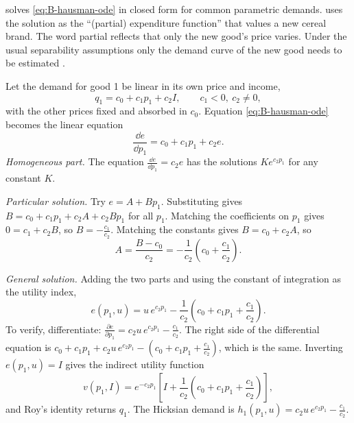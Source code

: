 \citet{Hausman1981} solves \eqref{eq:B-hausman-ode} in closed form for common parametric demands.
\citet[eq.~3, p.~212]{Hausman1997} uses the solution as the ``(partial) expenditure function'' that values a
new cereal brand. The word partial reflects that only the new good's price varies. Under the usual
separability assumptions only the demand curve of the new good needs to be estimated \citep[fn.~7]{Hausman1997}.

\begin{example}\label{ex:B-hausman-linear}
Let the demand for good 1 be linear in its own price and income,
\begin{equation*}
q_1 = c_0 + c_1p_1 + c_2I, \qquad c_1 < 0,\ c_2 \neq 0,
\end{equation*}
with the other prices fixed and absorbed in $c_0$. Equation \eqref{eq:B-hausman-ode} becomes the linear
equation
\begin{equation*}
\frac{\dd e}{\dd p_1} = c_0 + c_1p_1 + c_2e .
\end{equation*}
\textit{Homogeneous part.} The equation $\frac{\dd e}{\dd p_1} = c_2e$ has the solutions $Ke^{c_2p_1}$ for any
constant $K$.

\textit{Particular solution.} Try $e = A + Bp_1$. Substituting gives $B = c_0 + c_1p_1 + c_2A + c_2Bp_1$ for
all $p_1$. Matching the coefficients on $p_1$ gives $0 = c_1 + c_2B$, so $B = -\frac{c_1}{c_2}$. Matching the
constants gives $B = c_0 + c_2A$, so
\begin{equation*}
A = \frac{B - c_0}{c_2} = -\frac{1}{c_2}\left(c_0 + \frac{c_1}{c_2}\right).
\end{equation*}

\textit{General solution.} Adding the two parts and using the constant of integration as the utility index,
\begin{equation}\label{eq:B-hausman-e}
e(p_1, u) = u\,e^{c_2p_1} - \frac{1}{c_2}\left(c_0 + c_1p_1 + \frac{c_1}{c_2}\right).
\end{equation}
To verify, differentiate: $\frac{\partial e}{\partial p_1} = c_2u\,e^{c_2p_1} - \frac{c_1}{c_2}$. The right
side of the differential equation is
$c_0 + c_1p_1 + c_2u\,e^{c_2p_1} - \left(c_0 + c_1p_1 + \frac{c_1}{c_2}\right)$, which is the same. Inverting
$e(p_1, u) = I$ gives the indirect utility function
\begin{equation*}
v(p_1, I) = e^{-c_2p_1}\left[I + \frac{1}{c_2}\left(c_0 + c_1p_1 + \frac{c_1}{c_2}\right)\right],
\end{equation*}
and Roy's identity returns $q_1$. The Hicksian demand is
$h_1(p_1, u) = c_2u\,e^{c_2p_1} - \frac{c_1}{c_2}$.


\end{example}
